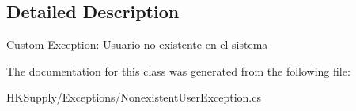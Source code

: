 \subsection{Detailed Description}
Custom Exception\+: Usuario no existente en el sistema 



The documentation for this class was generated from the following file\+:\begin{DoxyCompactItemize}
\item 
H\+K\+Supply/\+Exceptions/Nonexistent\+User\+Exception.\+cs\end{DoxyCompactItemize}
